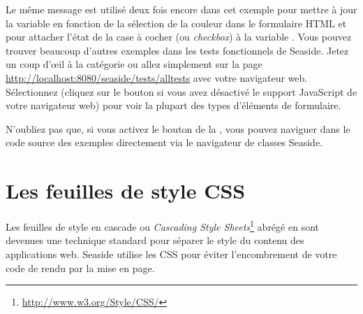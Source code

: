 \documentclass[a4paper,10pt,twoside]{book}
\begin{document}
Le même message est utilisé deux fois encore dans cet exemple pour
mettre à jour la variable  en fonction de la sélection de la
couleur dans le formulaire HTML et pour attacher l'état de la case à
cocher (ou \emph{checkbox}) à la variable .
Vous pouvez trouver beaucoup d'autres exemples dans les tests
fonctionnels de Seaside.
Jetez un coup d'\oe{}il à la catégorie  
ou allez simplement sur la page
\url{http://localhost:8080/seaside/tests/alltests} avec votre
navigateur web.
Sélectionnez  
(cliquez sur le bouton  si vous avez
  désactivé le support JavaScript de votre navigateur web) %
 pour voir la plupart des types d'éléments de formulaire.

N'oubliez pas que, si vous activez le bouton  de
la \toolbar, vous pouvez naviguer dans le code source des exemples
directement via le navigateur de classes Seaside. 

\section{Les feuilles de style CSS}


Les feuilles de style en cascade ou 
\emph{Cascading Style
  Sheets}\footnote{\url{http://www.w3.org/Style/CSS/}} abrégé en
  sont devenues une technique standard pour séparer le style
 du contenu des applications web.
Seaside utilise les CSS pour éviter l'encombrement de votre code de
rendu par la mise en page.
\end{document}

